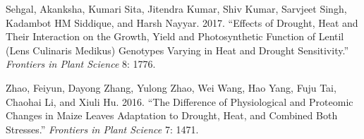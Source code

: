 \documentclass[
]{article}
\newlength{\cslhangindent}
\newenvironment{cslreferences}%
  {\setlength{\parindent}{0pt}%
  \everypar{\setlength{\hangindent}{\cslhangindent}}\ignorespaces}%
  {\par}
\begin{document}
\begin{cslreferences}
\leavevmode\hypertarget{ref-sehgal2017effects}{}%
Sehgal, Akanksha, Kumari Sita, Jitendra Kumar, Shiv Kumar, Sarvjeet Singh, Kadambot HM Siddique, and Harsh Nayyar. 2017. ``Effects of Drought, Heat and Their Interaction on the Growth, Yield and Photosynthetic Function of Lentil (Lens Culinaris Medikus) Genotypes Varying in Heat and Drought Sensitivity.'' \emph{Frontiers in Plant Science} 8: 1776.

\leavevmode\hypertarget{ref-zhao2016difference}{}%
Zhao, Feiyun, Dayong Zhang, Yulong Zhao, Wei Wang, Hao Yang, Fuju Tai, Chaohai Li, and Xiuli Hu. 2016. ``The Difference of Physiological and Proteomic Changes in Maize Leaves Adaptation to Drought, Heat, and Combined Both Stresses.'' \emph{Frontiers in Plant Science} 7: 1471.
\end{cslreferences}
\end{document}
